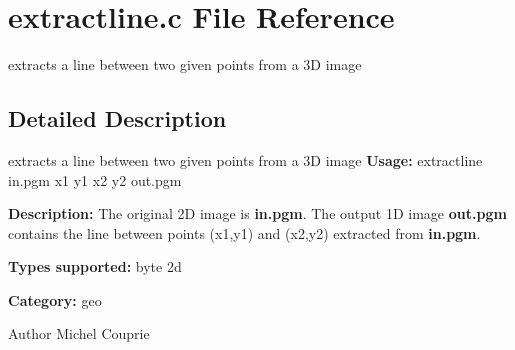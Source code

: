 \section{extractline.c File Reference}
\label{extractline_8c}


extracts a line between two given points from a 3D image  




\subsection{Detailed Description}
extracts a line between two given points from a 3D image {\bfseries Usage:} extractline in.pgm x1 y1 x2 y2 out.pgm

{\bfseries Description:} The original 2D image is {\bfseries in.pgm}. The output 1D image {\bfseries out.pgm} contains the line between points (x1,y1) and (x2,y2) extracted from {\bfseries in.pgm}.

{\bfseries Types supported:} byte 2d

{\bfseries Category:} geo

\begin{DoxyAuthor}{Author}
Michel Couprie 
\end{DoxyAuthor}
